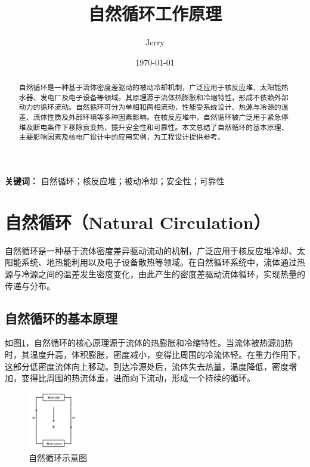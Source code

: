 \documentclass{article}
\title{\bf\huge 自然循环工作原理}
\author{Jerry}
\date{\today}
\begin{document}
\fancyfoot[C]{\thepage}

\maketitle
\tableofcontents

\begin{abstract}
    自然循环是一种基于流体密度差驱动的被动冷却机制，广泛应用于核反应堆、太阳能热水器、发电厂及电子设备等领域。其原理源于流体热膨胀和冷缩特性，形成不依赖外部动力的循环流动。自然循环可分为单相和两相流动，性能受系统设计、热源与冷源的温差、流体性质及外部环境等多种因素影响。在核反应堆中，自然循环被广泛用于紧急停堆及断电条件下移除衰变热，提升安全性和可靠性。本文总结了自然循环的基本原理、主要影响因素及核电厂设计中的应用实例，为工程设计提供参考。
\end{abstract}

\textbf{关键词：} 自然循环；核反应堆；被动冷却；安全性；可靠性

\section{自然循环（Natural Circulation）}

自然循环是一种基于流体密度差异驱动流动的机制，广泛应用于核反应堆冷却、太阳能系统、地热能利用以及电子设备散热等领域。在自然循环系统中，流体通过热源与冷源之间的温差发生密度变化，由此产生的密度差驱动流体循环，实现热量的传递与分布。

\subsection{自然循环的基本原理}

如图\ref{fig:cold-warm}，自然循环的核心原理源于流体的热膨胀和冷缩特性。当流体被热源加热时，其温度升高，体积膨胀，密度减小，变得比周围的冷流体轻。在重力作用下，这部分低密度流体向上移动。到达冷源处后，流体失去热量，温度降低，密度增加，变得比周围的热流体重，进而向下流动，形成一个持续的循环。

\begin{figure}[htbp]
    \centering
    \includegraphics[width=0.2\textwidth]{figures/cold-warm.png}
    \caption{自然循环示意图}
    \label{fig:cold-warm}
\end{figure}
\end{document}
